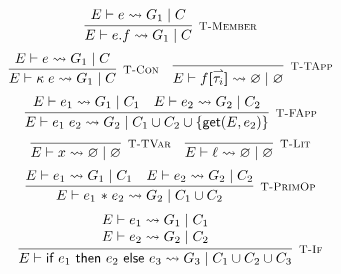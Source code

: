 \begin{figure}
    \centering
    \[
        \infer[\textsc{\footnotesize T-Member}]{
            E \vdash e.f
                \rightsquigarrow G_1\; |\; C
        }{
            E \vdash e \rightsquigarrow G_1\; |\; C
        }
    \]
    \vspace{10pt}
    \[
        \infer[\textsc{\footnotesize T-Con}]{
            E \vdash \kappa\; e
                \rightsquigarrow G_1\; |\; C
        }{
            E \vdash e \rightsquigarrow G_1\; |\; C
        }
        \hspace{1em}
        \infer[\textsc{\footnotesize T-TApp}]{
            E \vdash f\textbf{[}\harpoon{\tau_i}\textbf{]}
                \rightsquigarrow \varnothing\; |\; \varnothing
        }{
        }
    \]
    \vspace{10pt}
    \[
        \infer[\textsc{\footnotesize T-FApp}]{
            E \vdash e_1\; e_2
                \rightsquigarrow G_2\; |\; C_1 \cup C_2 
                \cup \{\textsf{get}(E,e_2)\}
        }{
            E \vdash e_1 \rightsquigarrow G_1\; |\; C_1
            \hspace{1em}
            E \vdash e_2 \rightsquigarrow G_2\; |\; C_2
        }
    \]
    \vspace{10pt}
    \[
        \infer[\textsc{\footnotesize T-TVar}]{
            E \vdash x
                \rightsquigarrow \varnothing\; |\; \varnothing
        }{}
        \hspace{1em}
        \infer[\textsc{\footnotesize T-Lit}]{
            E \vdash \ell
                \rightsquigarrow \varnothing\; |\; \varnothing
        }{}
    \]
    \vspace{10pt}
    \[
        \infer[\textsc{\footnotesize T-PrimOp}]{
            E \vdash e_1 \text{ \textasteriskcentered }\; e_2
                \rightsquigarrow G_2\; |\; C_1 \cup C_2
        }{
            E \vdash e_1 \rightsquigarrow G_1\; |\; C_1
            \hspace{1em}
            E \vdash e_2 \rightsquigarrow G_2\; |\; C_2
        }
    \]
    \vspace{10pt}
    \[
        \infer[\textsc{\footnotesize T-If}]{
            E \vdash \textsf{if } e_1 \textsf{ then } e_2 \textsf{ else } e_3
                \rightsquigarrow G_3\; |\; C_1 \cup C_2 \cup C_3
        }{
            \begin{array}{c}
                E \vdash e_1 \rightsquigarrow G_1\; |\; C_1 \\
                E \vdash e_2 \rightsquigarrow G_2\; |\; C_2

\end{array}}\]
\end{figure}

